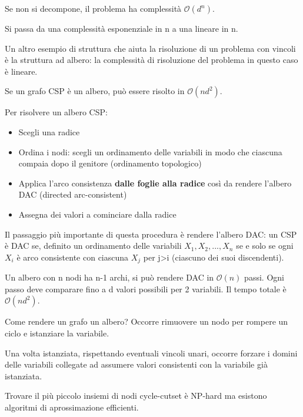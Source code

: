 Se non si decompone, il problema ha complessità $\mathcal{O}(d^n)$.

Si passa da una complessità esponenziale in n a una lineare in n.

Un altro esempio di struttura che aiuta la risoluzione di un problema con
vincoli è la struttura ad albero: la complessità di risoluzione del problema
in questo caso è lineare.

Se un grafo CSP è un albero, può essere risolto in $\mathcal{O}(nd^2)$.

Per risolvere un albero CSP:

\begin{itemize}
 \item Scegli una radice
 \item Ordina i nodi: scegli un ordinamento delle variabili in modo che
ciascuna compaia dopo il genitore (ordinamento topologico)
 \item Applica l'arco consistenza \textbf{dalle foglie alla radice}
così da rendere l'albero DAC (directed arc-consistent)
 \item Assegna dei valori a cominciare dalla radice
\end{itemize}

Il passaggio più importante di questa procedura è rendere l'albero
DAC: un CSP è DAC se, definito un ordinamento delle variabili
$X_1, X_2, ..., X_n$ se e solo se ogni $X_i$ è arco consistente
con ciascuna $X_j$ per j>i (ciascuno dei suoi discendenti).

Un albero con n nodi ha n-1 archi, si può rendere DAC in
$\mathcal{O}(n)$ passi. Ogni passo deve comparare fino a
d valori possibili per 2 variabili. Il tempo totale è
$\mathcal{O}(nd^2)$.

Come rendere un grafo un albero? Occorre rimuovere un nodo per
rompere un ciclo e istanziare la variabile.

Una volta istanziata, rispettando eventuali vincoli unari,
occorre forzare i domini delle variabili collegate ad assumere
valori consistenti con la variabile già istanziata.

Trovare il più piccolo insiemi di nodi cycle-cutset è NP-hard
ma esistono algoritmi di aprossimazione efficienti.

